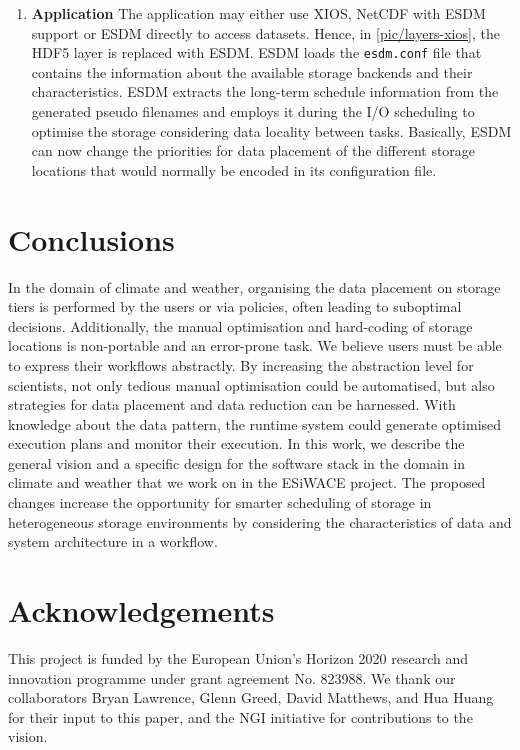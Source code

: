 \documentclass{superfri}
\begin{document}
\begin{enumerate}
  \item \textbf{Application}
  The application may either use XIOS, NetCDF with ESDM support or ESDM directly to access datasets.
  Hence, in \cref{pic/layers-xios}, the HDF5 layer is replaced with ESDM.
  ESDM loads the \texttt{esdm.conf} file that contains the information about the available storage backends and their characteristics.
  ESDM extracts the long-term schedule information from the generated pseudo filenames and employs it during the I/O scheduling to optimise the storage considering data locality between tasks.
  Basically, ESDM can now change the priorities for data placement of the different storage locations that would normally be encoded in its configuration file.
\end{enumerate}

\section*{Conclusions}
\label{sec:conclusions}

In the domain of climate and weather, organising the data placement on storage tiers is performed by the users or via policies, often leading to suboptimal decisions.
Additionally, the manual optimisation and hard-coding of storage locations is non-portable and an error-prone task.
We believe users must be able to express their workflows abstractly.
By increasing the abstraction level for scientists, not only tedious manual optimisation could be automatised, but also strategies for data placement and data reduction can be harnessed.
With knowledge about the data pattern, the runtime system could generate optimised execution plans and monitor their execution.
In this work, we describe the general vision and a specific design for the software stack in the domain in climate and weather that we work on in the ESiWACE project.
The proposed changes increase the opportunity for smarter scheduling of storage in heterogeneous storage environments by considering the characteristics of data and system architecture in a workflow.

\section*{Acknowledgements}

\small
This project is funded by the European Union's Horizon 2020 research and innovation programme under grant agreement No. 823988.
We thank our collaborators Bryan Lawrence, Glenn Greed, David Matthews, and Hua Huang for their input to this paper, and the NGI initiative for contributions to the vision.

\openaccess


\end{document}
